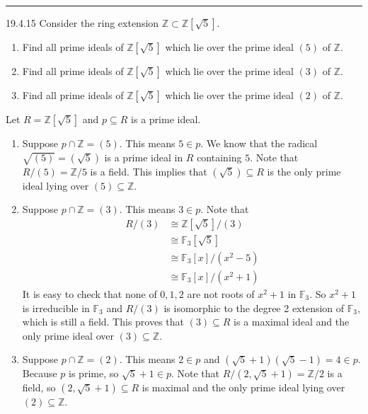 \documentclass[letterpaper, 12pt]{article}
\begin{document}
\noindent\rule{7in}{2.8pt}
\begin{problem}{19.4.15}
Consider the ring extension \(\mathbb{Z}\subset \mathbb{Z}[\sqrt{5}]\).
\begin{enumerate}[(1)]
\item Find all prime ideals of \(\mathbb{Z}[\sqrt{5}]\) which lie over the prime ideal \((5)\) of \(\mathbb{Z}\).
\item Find all prime ideals of \(\mathbb{Z}[\sqrt{5}]\) which lie over the prime ideal \((3)\) of \(\mathbb{Z}\).
\item Find all prime ideals of \(\mathbb{Z}[\sqrt{5}]\) which lie over the prime ideal \((2)\) of \(\mathbb{Z}\).
\end{enumerate}
\end{problem}
\begin{solution}
Let \(R=\mathbb{Z}[\sqrt{5}]\) and \(p\subseteq R\) is a prime ideal.
\begin{enumerate}[(1)]
\item Suppose \(p\cap \mathbb{Z}=(5)\). This means \(5\in p\). We know that the radical \(\sqrt{(5)}=(\sqrt{5})\) is a prime ideal in \(R\) containing \(5\). Note that \(R/(5)=\mathbb{Z}/5\) is a field. This implies that \((\sqrt{5})\subseteq R\) is the only prime ideal lying over \((5)\subseteq \mathbb{Z}\).
\item Suppose \(p\cap \mathbb{Z}=(3)\). This means \(3\in p\). Note that 
\begin{align*}
    R/(3)&\cong \mathbb{Z}[\sqrt{5}]/(3)\\ 
         &\cong \mathbb{F}_3[\sqrt{5}]\\ 
         &\cong \mathbb{F}_3[x]/(x^2-5)\\ 
         &\cong \mathbb{F}_3[x]/(x^2+1)
\end{align*}
It is easy to check that none of \(0,1,2\) are not roots of \(x^2+1\) in \(\mathbb{F}_3\). So \(x^2+1\) is irreducible in \(\mathbb{F}_3\) and \(R/(3)\) is isomorphic to the degree 2 extension of \(\mathbb{F}_3\), which is still a field. This proves that \((3)\subseteq R\) is a maximal ideal and the only prime ideal over \((3)\subseteq \mathbb{Z}\). 
\item Suppose \(p\cap \mathbb{Z}=(2)\). This means \(2\in p\) and \((\sqrt{5}+1)(\sqrt{5}-1)=4\in p\). Because \(p\) is prime, so \(\sqrt{5}+1\in p\). Note that \(R/(2,\sqrt{5}+1)=\mathbb{Z}/2\) is a field, so \((2,\sqrt{5}+1)\subseteq R\) is maximal and the only prime ideal lying over \((2)\subseteq \mathbb{Z}\).
\end{enumerate}
\end{solution}
\end{document}
